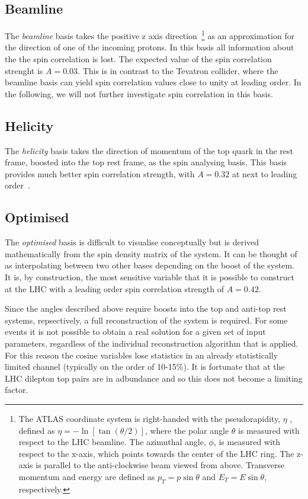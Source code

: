 \subsection{Beamline}
The \emph{beamline} basis takes the positive z axis direction~\footnote{The ATLAS coordinate system is right-handed with the
pseudorapidity, $\eta$ , defined as $\eta = −\ln[\tan(\theta/2)]$, where the
polar angle $\theta$ is measured with respect to the LHC beamline. The
azimuthal angle, $\phi$, is measured with respect to the x-axis, which
points towards the center of the LHC ring. The z-axis is parallel to
the anti-clockwise beam viewed from above. Transverse momentum and
energy are defined as $p_T =p \sin\theta$ and $E_T =E \sin\theta$, respectively.} as an approximation for the direction of one of the incoming protons. In this basis all information about the the spin correlation is lost. The expected value of the spin correlation strenght is $A = 0.03$. This is in contrast to the Tevatron collider, where the beamline basis can yield spin correlation values close to unity at leading order. In the following, we will not further investigate spin correlation in this basis. 

\subsection{Helicity}
The \emph{helicity} basis takes the direction of momentum of the top quark in the \ttbar rest frame, boosted into the top rest frame, as the spin analysing basis. This basis provides much better spin correlation strength, with $A=0.32$ at next to leading order~\cite{Bernreuther:2010ny}. 

\subsection{Optimised}
The \emph{optimised} basis is difficult to visualise conceptually but is derived mathematically from the spin density matrix of the \ttbar system. It can be thought of as interpolating between two other bases depending on the boost of the system. It is, by construction, the most sensitive variable that it is possible to construct at the LHC with a leading order spin correlation strength of $A=0.42$.

Since the angles described above require boosts into the top and anti-top rest systems, repsectively, a full reconstruction of the \ttbar system is required. For some events it is not possible to obtain a real solution for a given set of input parameters, regardless of the individual reconstruction algorithm that is applied. For this reason the cosine variables lose statistics in an already statistically limited channel (typically on the order of 10-15\%). It is fortunate that at the LHC dilepton top pairs are in adbundance and so this does not become a limiting factor.  

